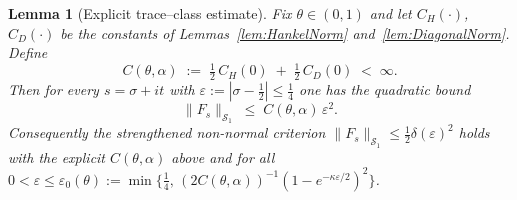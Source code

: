 \documentclass[11pt,a4paper]{article}
\newtheorem{lemma}[theorem]{Lemma}
\theoremstyle{definition}
\theoremstyle{remark}
\begin{document}
\begin{lemma}[Explicit trace–class estimate]\label{lem:Fs-trace}
Fix \(\theta\in(0,1)\) and let \(C_H(\cdot)\), \(C_D(\cdot)\) be the
constants of Lemmas~\ref{lem:HankelNorm} and~\ref{lem:DiagonalNorm}.
Define
\[
   C(\theta,\alpha)
   \;:=\;
   \tfrac12\,C_H(0) \;+\; \tfrac12\,C_D(0)
   \;<\;\infty .
\]
Then for every \(s=\sigma+it\) with \(\varepsilon:=|\sigma-\tfrac12|\le
\tfrac14\) one has the quadratic bound
\[
   \boxed{\;
      \|F_s\|_{\mathcal S_1}
      \;\le\;
      C(\theta,\alpha)\,\varepsilon^{2}.
   \;}
\]
Consequently the strengthened non-normal criterion
\(\|F_s\|_{\mathcal S_1}\le \tfrac12\delta(\varepsilon)^2\) holds with the
explicit \(C(\theta,\alpha)\) above and for all
\(0<\varepsilon\le\varepsilon_{0}(\theta):=
\min\bigl\{\tfrac14,\,(2C(\theta,\alpha))^{-1}(1-e^{-\kappa\varepsilon/2})^2\bigr\}\).
\end{lemma}
\end{document}
